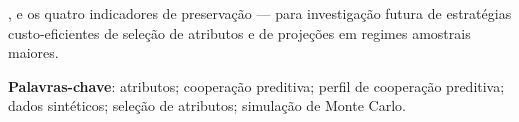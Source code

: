 \Wmat{}, \Rmat{} e os quatro indicadores de preservação --- para investigação futura de estratégias custo-eficientes de seleção de atributos e de projeções em regimes amostrais maiores.

\vspace{\onelineskip}
\noindent\textbf{Palavras-chave}: atributos; cooperação preditiva; perfil de cooperação preditiva; dados sintéticos; seleção de atributos; simulação de Monte Carlo.
